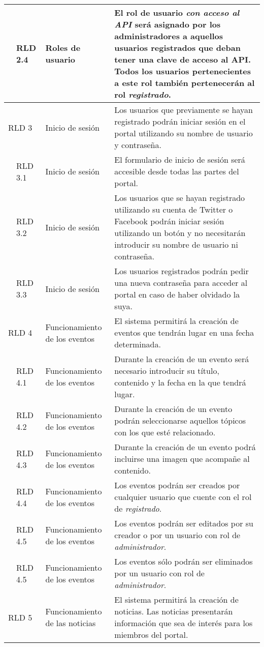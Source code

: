 \begin{longtable}[c]{|p{1mm}|p{14mm}|p{30mm}|p{90mm}|}
\hline
& RLD 2.4 & Roles de usuario & El rol de usuario \textit{con acceso al API} será asignado por los administradores a aquellos usuarios registrados que deban tener una clave de acceso al API.  Todos los usuarios pertenecientes a este rol también pertenecerán al rol \textit{registrado}. \\
\hline
\multicolumn{2}{|l|}{RLD 3} & Inicio de sesión & Los usuarios que previamente se hayan registrado podrán iniciar sesión en el portal utilizando su nombre de usuario y contraseña. \\
\hline
& RLD 3.1 & Inicio de sesión & El formulario de inicio de sesión será accesible desde todas las partes del portal. \\
\hline
& RLD 3.2 & Inicio de sesión & Los usuarios que se hayan registrado utilizando su cuenta de Twitter o Facebook podrán iniciar sesión utilizando un botón y no necesitarán introducir su nombre de usuario ni contraseña. \\
\hline
& RLD 3.3 & Inicio de sesión & Los usuarios registrados podrán pedir una nueva contraseña para acceder al portal en caso de haber olvidado la suya. \\
\hline
\multicolumn{2}{|l|}{RLD 4} & Funcionamiento de los eventos & El sistema permitirá la creación de eventos que tendrán lugar en una fecha determinada. \\
\hline
& RLD 4.1 & Funcionamiento de los eventos & Durante la creación de un evento será necesario introducir su título, contenido y la fecha en la que tendrá lugar. \\
\hline
& RLD 4.2 & Funcionamiento de los eventos & Durante la creación de un evento podrán seleccionarse aquellos tópicos con los que esté relacionado. \\
\hline
& RLD 4.3 & Funcionamiento de los eventos & Durante la creación de un evento podrá incluirse una imagen que acompañe al contenido. \\
\hline
& RLD 4.4 & Funcionamiento de los eventos & Los eventos podrán ser creados por cualquier usuario que cuente con el rol de \textit{registrado}. \\
\hline
& RLD 4.5 & Funcionamiento de los eventos & Los eventos podrán ser editados por su creador o por un usuario con rol de \textit{administrador}. \\
\hline
& RLD 4.5 & Funcionamiento de los eventos & Los eventos sólo podrán ser eliminados por un usuario con rol de \textit{administrador}. \\
\hline
\multicolumn{2}{|l|}{RLD 5} & Funcionamiento de las noticias & El sistema permitirá la creación de noticias.  Las noticias presentarán información que sea de interés para los miembros del portal. \\

\end{longtable}
